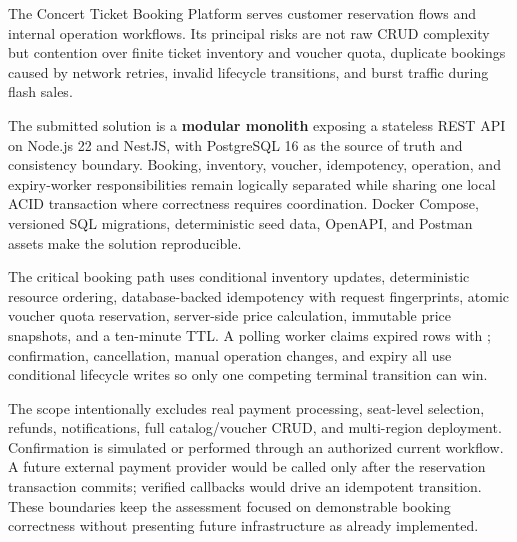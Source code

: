 The Concert Ticket Booking Platform serves customer reservation flows and
internal operation workflows. Its principal risks are not raw CRUD complexity
but contention over finite ticket inventory and voucher quota, duplicate
bookings caused by network retries, invalid lifecycle transitions, and burst
traffic during flash sales.

The submitted solution is a \textbf{modular monolith} exposing a stateless REST
API on Node.js 22 and NestJS, with PostgreSQL 16 as the source of truth and
consistency boundary. Booking, inventory, voucher, idempotency, operation, and
expiry-worker responsibilities remain logically separated while sharing one
local ACID transaction where correctness requires coordination. Docker Compose,
versioned SQL migrations, deterministic seed data, OpenAPI, and Postman assets
make the solution reproducible.

The critical booking path uses conditional inventory updates, deterministic
resource ordering, database-backed idempotency with request fingerprints,
atomic voucher quota reservation, server-side price calculation, immutable
price snapshots, and a ten-minute  TTL. A polling worker claims
expired rows with ; confirmation, cancellation,
manual operation changes, and expiry all use conditional lifecycle writes so
only one competing terminal transition can win.

The scope intentionally excludes real payment processing, seat-level
selection, refunds, notifications, full catalog/voucher CRUD, and multi-region
deployment. Confirmation is simulated or performed through an authorized
current workflow. A future external payment provider would be called only
after the reservation transaction commits; verified callbacks would drive an
idempotent  transition. These boundaries keep the
assessment focused on demonstrable booking correctness without presenting
future infrastructure as already implemented.
